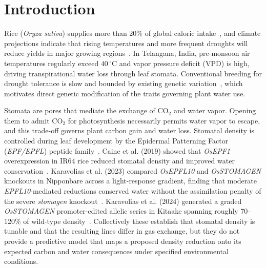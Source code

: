 \documentclass[runningheads]{llncs}
\begin{document}
\begin{abstract}
magnitude (Spearman $\rho=-0.50$ for $A$, $-0.58$ for $g_s$), and the most severe genotypes are the worst predicted. Second, absolute values do not transfer across studies, and normalizing to a within-study wild-type control does not rescue transfer (leave-one-study-out $R^{2}=-0.28$ for $A$, $-0.04$ for $g_s$); with only three studies these estimates are themselves unstable. Third, the literature contains a 29.5-point gap in stomatal-density reduction between 28.5\% and 58\%, and the entire 30--70\% decision-relevant band is represented by a single genotype (5 measurements). Within its validated domain the model predicts that a 30\% reduction retains 94.9\% of wild-type assimilation while reducing conductance to 92.0\%.

\end{abstract}
\section{Introduction}\label{sec:intro}

Rice (\textit{Oryza sativa}) supplies more than 20\% of global caloric intake~\cite{ref_fao}, and climate projections indicate that rising temperatures and more frequent droughts will reduce yields in major growing regions~\cite{ref_ipcc}. In Telangana, India, pre-monsoon air temperatures regularly exceed $40\,^{\circ}$C and vapor pressure deficit (VPD) is high, driving transpirational water loss through leaf stomata. Conventional breeding for drought tolerance is slow and bounded by existing genetic variation~\cite{ref_crispr_review}, which motivates direct genetic modification of the traits governing plant water use.

Stomata are pores that mediate the exchange of CO$_2$ and water vapor. Opening them to admit CO$_2$ for photosynthesis necessarily permits water vapor to escape, and this trade-off governs plant carbon gain and water loss. Stomatal density is controlled during leaf development by the Epidermal Patterning Factor (\textit{EPF/EPFL}) peptide family~\cite{ref_hepworth}. Caine et al. (2019) showed that \textit{OsEPF1} overexpression in IR64 rice reduced stomatal density and improved water conservation~\cite{ref_caine}. Karavolias et al. (2023) compared \textit{OsEPFL10} and \textit{OsSTOMAGEN} knockouts in Nipponbare across a light-response gradient, finding that moderate \textit{EPFL10}-mediated reductions conserved water without the assimilation penalty of the severe \textit{stomagen} knockout~\cite{ref_kara2023}. Karavolias et al. (2024) generated a graded \textit{OsSTOMAGEN} promoter-edited allelic series in Kitaake spanning roughly 70--120\% of wild-type density~\cite{ref_kara2024}. Collectively these establish that stomatal density is tunable and that the resulting lines differ in gas exchange, but they do not provide a predictive model that maps a proposed density reduction onto its expected carbon and water consequences under specified environmental conditions.
\end{document}

